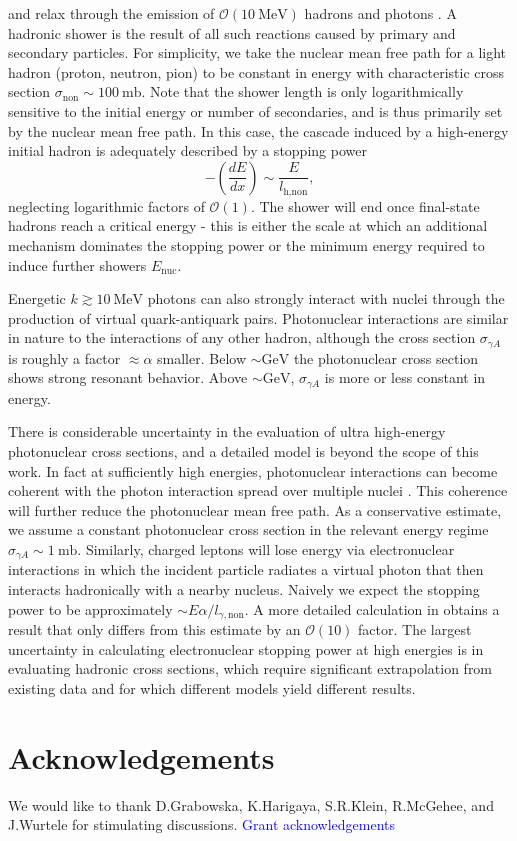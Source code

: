 \documentclass[twocolumn,showpacs,preprintnumbers,amsmath,amssymb,prd]{revtex4}
\newcommand{\OO}{\mathcal{O}}
\newcommand{\GeV}{\text{GeV}}
\def\r{\right)}
\def\l{\left(}
\begin{document}
\begin{appendices}
 and relax through the emission of $\OO(10 ~\text{MeV})$ hadrons and photons \cite{Rossi}.
A hadronic shower is the result of all such reactions caused by primary and secondary particles.
For simplicity, we take the nuclear mean free path for a light hadron (proton, neutron, pion) to be constant in energy with characteristic cross section $\sigma_\text{non} \sim 100 ~\text{mb}$. 
Note that the shower length is only logarithmically sensitive to the initial energy or number of secondaries, and is thus primarily set by the nuclear mean free path.
In this case, the cascade induced by a high-energy initial hadron is adequately described by a stopping power
\begin{equation}
\label{eq:nucshower}
-\l \frac{dE}{dx}\r \sim \frac{E}{l_\text{h,non}},
\end{equation}
neglecting logarithmic factors of $\OO(1)$.
The shower will end once final-state hadrons reach a critical energy - this is either the scale at which an additional mechanism dominates the stopping power or the minimum energy required to induce further showers $E_\text{nuc}$.

Energetic $k \gtrsim 10 ~\text{MeV}$ photons can also strongly interact with nuclei through the production of virtual quark-antiquark pairs. 
Photonuclear interactions are similar in nature to the interactions of any other hadron, although the cross section $\sigma_{\gamma A}$ is roughly a factor $\approx \alpha$ smaller. 
Below $\sim \GeV$ the photonuclear cross section shows strong resonant behavior. 
Above $\sim \GeV$, $\sigma_{\gamma A}$ is more or less constant in energy. 

There is considerable uncertainty in the evaluation of ultra high-energy photonuclear cross sections, and a detailed model is beyond the scope of this work.
In fact at sufficiently high energies, photonuclear interactions can become coherent with the photon interaction spread over multiple nuclei \cite{Gerhardt:2010bj}.
This coherence will further reduce the photonuclear mean free path.
As a conservative estimate, we assume a constant photonuclear cross section in the relevant energy regime $\sigma_{\gamma A} \sim 1 ~\text{mb}$. 
Similarly, charged leptons will lose energy via electronuclear interactions in which the incident particle radiates a virtual photon that then interacts hadronically with a nearby nucleus.
Naively we expect the stopping power to be approximately $\sim E \alpha/l_{\gamma, \text{non}}$.
A more detailed calculation in \cite{Gerhardt:2010bj} obtains a result that only differs from this estimate by an $\OO(10)$ factor.
The largest uncertainty in calculating electronuclear stopping power at high energies is in evaluating hadronic cross sections, which require significant extrapolation from existing data and for which different models yield different results.

\end{appendices}
\section*{Acknowledgements}
We would like to thank D.Grabowska, K.Harigaya, S.R.Klein, R.McGehee, and J.Wurtele for stimulating discussions.
\textcolor{blue}{Grant acknowledgements}


\end{document}
